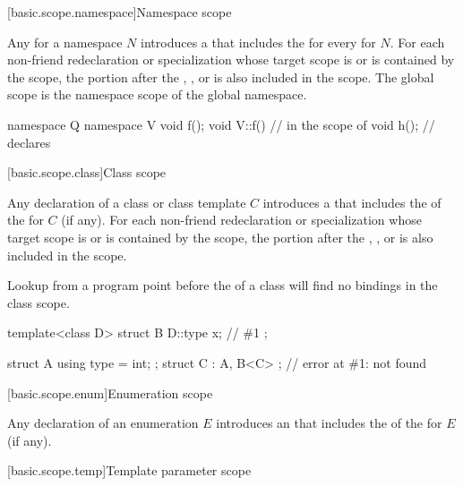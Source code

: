 [basic.scope.namespace]{Namespace scope}

\pnum
Any  for a namespace $N$ introduces
a 
that includes the 
for every  for $N$.
For each non-friend redeclaration or specialization
whose target scope is or is contained by the scope,
the portion after the
,
, or
is also included in the scope.
The global scope is
the namespace scope of the global namespace.
\begin{example}
\begin{codeblock}
namespace Q {
  namespace V { void f(); }
  void V::f() {         // in the scope of 
    void h();           // declares 
  }
}
\end{codeblock}
\end{example}

[basic.scope.class]{Class scope}

\pnum
Any declaration of a class or class template $C$ introduces
a 
that includes the  of
the  for $C$ (if any).
For each non-friend redeclaration or specialization
whose target scope is or is contained by the scope,
the portion after the
,
, or
 is also included in the scope.
\begin{note}
Lookup from a program point
before the  of a class
will find no bindings in the class scope.
\begin{example}
\begin{codeblock}
template<class D>
struct B {
  D::type x;            // \#1
};

struct A { using type = int; };
struct C : A, B<C> {};  // error at \#1:  not found
\end{codeblock}
\end{example}
\end{note}

[basic.scope.enum]{Enumeration scope}%

\pnum
Any declaration of an enumeration $E$ introduces
an 
that includes the  of
the  for $E$ (if any).

[basic.scope.temp]{Template parameter scope}%

